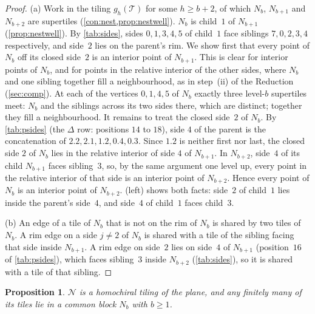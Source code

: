 \documentclass[11pt]{amsart}
\newtheorem{proposition}[theorem]{Proposition}
\theoremstyle{definition}
\theoremstyle{remark}
\newcommand{\T}{\mathcal T}
\newcommand{\N}{\mathcal N}
\begin{document}
\begin{proof}
(a) Work in the tiling $g_h(\T)$ for some $h\ge b+2$, of which $N_b$, $N_{b+1}$ and $N_{b+2}$ are supertiles
(\cref{con:nest,prop:nestwell}). $N_b$ is child~$1$ of $N_{b+1}$ (\cref{prop:nestwell}). By \cref{tab:sides}, sides $0,1,3,4,5$ of child~$1$ face
siblings $7,0,2,3,4$ respectively, and side~$2$ lies on the parent's rim. We show first that every point of $N_b$ off
its closed side~$2$ is an interior point of $N_{b+1}$. This is clear for interior points of $N_b$, and for points in the
relative interior of the other sides, where $N_b$ and one sibling together fill a neighbourhood, as in step~(ii) of
the Reduction (\cref{sec:comp}). At each of the vertices
$0,1,4,5$ of $N_b$ exactly three level-$b$ supertiles meet: $N_b$ and the siblings across its two sides there, which are
distinct; together they fill a neighbourhood. It remains to treat the closed side~$2$ of $N_b$. By \cref{tab:psides}
(the $\Delta$ row: positions $14$ to $18$), side $4$ of the parent is the concatenation of $2.2,2.1,1.2,0.4,0.3$. Since
$1.2$ is neither first nor last, the closed side $2$ of $N_b$ lies in the relative interior of side $4$ of $N_{b+1}$. In
$N_{b+2}$, side~$4$ of its child $N_{b+1}$ faces sibling~$3$, so, by the same argument one level up, every point in the
relative interior of that side is an interior point of $N_{b+2}$. Hence every point of $N_b$ is an interior point of
$N_{b+2}$.  (left) shows both facts: side~$2$ of child~$1$ lies inside the parent's side~$4$, and
side~$4$ of child~$1$ faces child~$3$.

(b) An edge of a tile of $N_b$ that is not on the rim of $N_b$ is shared by two tiles of $N_b$. A rim edge on a side
$j\ne2$ of $N_b$ is shared with a tile of the sibling facing that side inside $N_{b+1}$. A rim edge on side~$2$ lies on
side~$4$ of $N_{b+1}$ (position~$16$ of \cref{tab:psides}), which faces sibling~$3$ inside $N_{b+2}$ (\cref{tab:sides}),
so it is shared with a tile of that sibling.
\end{proof}

\begin{proposition}\label{prop:nesttiling}
$\N$ is a homochiral tiling of the plane, and any finitely many of its tiles lie in a common block $N_b$ with $b\ge1$.
\end{proposition}
\end{document}
